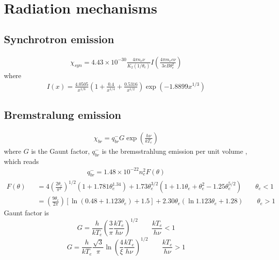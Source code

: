 \documentclass[12pt]{book}
\begin{document}
\section{Radiation mechanisms}
\subsection{Synchrotron emission}
\begin{eqnarray}
\chi_{syn}=4.43\times10^{-30}\frac{4\pi n_e\nu}{K_2(1/\theta_e)}
I\left(\frac{4\pi m_ec\nu}{3eB\theta_e^2}\right)
\end{eqnarray}
where
\begin{eqnarray}
I(x)=\frac{4.0505}{x^{1/6}}\left(1+\frac{0.4}{x^{1/4}}+\frac{0.5316}{x^{1/2}}\right)
\exp(-1.8899x^{1/3})
\end{eqnarray}
\subsection{Bremstralung emission}
\begin{eqnarray}
\chi_{br}=q_{br}^{-}G\exp\left(\frac{h\nu}{kT_e}\right)
\end{eqnarray}
where $G$ is the Gaunt factor, $q_{br}^{-}$ is the bremsstrahlung emission per unit volume
, which reads
\begin{eqnarray}
q_{br}^{-}=1.48\times10^{-22}n_e^2F(\theta)
\end{eqnarray}
\begin{eqnarray}
F(\theta)&&=4\left(\frac{2\theta_e}{\pi^3}\right)^{1/2}(1+1.781\theta_e^{1.34})
+1.73\theta_e^{3/2}(1+1.1\theta_e+\theta_e^2-1.25\theta_e^{5/2})\qquad\theta_e<1\nonumber\\
&&=\left(\frac{9\theta_e}{2\pi}\right)[\ln(0.48+1.123\theta_e)+1.5]
+2.30\theta_e(\ln1.123\theta_e+1.28)\qquad\theta_e>1
\end{eqnarray}
Gaunt factor is
\begin{equation}
G=\frac{h}{kT_e}\left(\frac{3}{\pi}\frac{kT_e}{h\nu}\right)^{1/2}\qquad \frac{kT_e}{h\nu}<1
\end{equation}
\begin{equation}
G=\frac{h}{kT_e}\frac{\sqrt{3}}{\pi}\ln\left(\frac{4}{\xi}\frac{kT_e}{h\nu}\right)^{1/2}
\qquad \frac{kT_e}{h\nu}>1
\end{equation}
\end{document}

